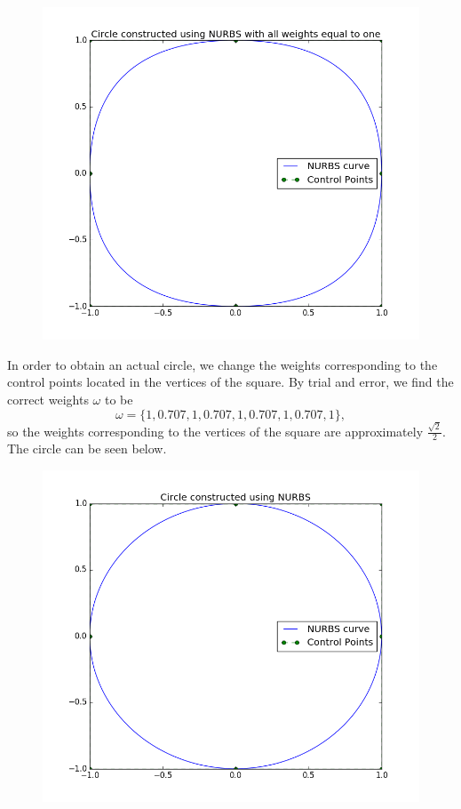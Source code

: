 \documentclass[]{article}
\begin{document}
\begin{figure}[h!]
	\includegraphics[scale=0.6]{splinecircle}
\end{figure}
In order to obtain an actual circle, we change the weights corresponding to the control points located in the vertices of the square. By trial and error, we find the correct weights $\omega$ to be \begin{equation*}
\omega= \{1, 0.707, 1, 0.707, 1, 0.707, 1, 0.707, 1\},
\end{equation*}
so the weights corresponding to the vertices of the square are approximately $\frac{\sqrt{2}}{2}$. The circle can be seen below.
\begin{figure}[h!]
	\includegraphics[scale=0.6]{nurbscircle}
\end{figure}
\end{document}
